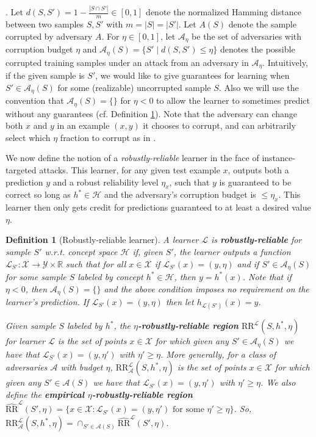 \documentclass[11pt]{article}
\newcommand{\CR}{\text{RR}}
\newcommand{\ECR}{\widehat{\text{RR}}}
\newtheorem{definition}{Definition}
\newcommand{\R}{\mathbb{R}}
\newcommand{\0}{\mathbf{0}}
\newcommand{\1}{\mathbf{1}}
\newcommand{\cA}{\mathcal{A}}
\newcommand{\cH}{\mathcal{H}}
\newcommand{\cL}{\mathcal{L}}
\newcommand{\cY}{\mathcal{Y}}
\newcommand{\cX}{\mathcal{X}}
\begin{document}
. Let $d(S,S')=1-\frac{|S\cap S'|}{m}\in[0,1]$ denote the normalized Hamming distance between two samples $S,S'$ with $m=|S|=|S'|$. Let $A(S)$ denote the sample corrupted by adversary $A$. For $\eta\in[0,1]$, let $\cA_\eta$ be the set of adversaries with corruption budget $\eta$ and $\cA_\eta(S)=\{S'\mid d(S,S')\le \eta\}$ denotes the possible corrupted training samples under an attack from an adversary in $\cA_\eta$. Intuitively, if the given sample is $S'$, we would like to give guarantees for learning when $S'\in\cA_\eta(S)$ for some (realizable) uncorrupted sample $S$. Also we will use the convention that $\cA_\eta(S)=\{\}$ for $\eta<0$ to allow the learner to sometimes predict without any guarantees (cf. Definition \ref{def:robustly-reliable learner}). Note that the adversary can change both $x$ and $y$ in an example $(x,y)$ it chooses to corrupt, and can arbitrarily select which $\eta$ fraction to corrupt as in \cite{bshouty2002pac}.



We now define the notion of a {\em robustly-reliable} learner in the face of instance-targeted attacks.  This learner, for any given test example $x$, outputs both a prediction $y$ and a robust reliability level $\eta_x$, such that $y$ is guaranteed to be correct so long as $h^* \in \cH$ and the adversary's corruption budget is $\leq \eta_x$.  This learner then only gets credit for predictions guaranteed to at least a desired value $\eta$.


\begin{definition}[Robustly-reliable learner] A learner $\cL$ is {\bf robustly-reliable} for sample $S'$ w.r.t. concept space $\cH$ if, given $S'$, the learner outputs a function $\cL_{S'}:\cX\rightarrow\cY\times\R$ such that for all $x\in\cX$ if $\cL_{S'}(x)=(y,\eta)$ and if $S'\in \cA_\eta(S)$ for some sample $S$ labeled by concept $h^*\in\cH$, then $y=h^*(x)$. Note that if $\eta<0$, then  $\cA_\eta(S)=\{\}$ and the above condition imposes no requirement on the learner's prediction.
If $\cL_{S'}(x)=(y,\eta)$ then let $h_{\cL(S')}(x)=y$.

Given sample $S$ labeled by $h^*$, the {\bf $\eta$-robustly-reliable region} $\CR^\cL(S,h^*,\eta)$ for learner $\cL$ is the set of points $x\in\cX$ for which given any $S'\in\cA_\eta(S)$ we have that $\cL_{S'}(x)=(y,\eta')$ with $\eta'\ge\eta$. More generally, for a class of adversaries $\cA$ with budget $\eta$, $\CR^\cL_\cA(S,h^*,\eta)$ is the set of points $x\in\cX$ for which given any $S'\in\cA(S)$ we have that $\cL_{S'}(x)=(y,\eta')$ with $\eta'\ge\eta$.
We also define the {\bf empirical $\eta$-robustly-reliable region} $\ECR^\cL(S',\eta) = \{x \in \cX : \cL_{S'}(x) = (y,\eta') \mbox{ for some }\eta'\geq \eta\}$.  So, $\CR^\cL_\cA(S,h^*,\eta) = \cap_{S'\in\cA(S)} \ECR^\cL(S',\eta)$.
\label{def:robustly-reliable learner}
\end{definition}
\end{document}
